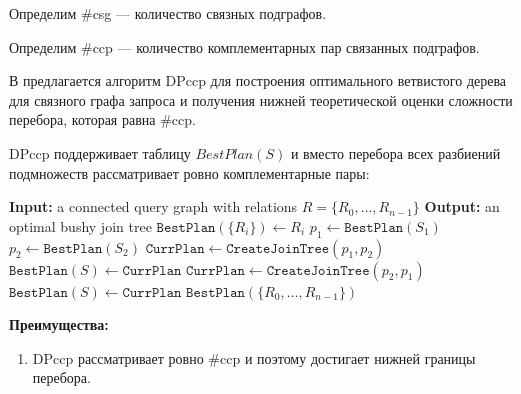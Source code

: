 Определим \#csg --- количество связных подграфов.
\par

Определим \#ccp --- количество комплементарных пар связанных подграфов.
\par

В \cite{CCP} предлагается алгоритм DPccp для построения оптимального ветвистого дерева для связного 
графа запроса и получения нижней теоретической оценки сложности перебора, которая равна \#ccp.

DPccp поддерживает таблицу $BestPlan(S)$ и вместо перебора всех разбиений подмножеств рассматривает ровно 
комплементарные пары:

\begin{algorithm}[H]
\caption{DPccp}
\begin{algorithmic}[1]
\State \textbf{Input:} a connected query graph with relations $R=\{R_0,\dots,R_{n-1}\}$
\State \textbf{Output:} an optimal bushy join tree
    \State $\texttt{BestPlan}(\{R_i\}) \gets R_i$
\EndFor
{}
    \State $p_1 \gets \texttt{BestPlan}(S_1)$
    \State $p_2 \gets \texttt{BestPlan}(S_2)$
    \State $\texttt{CurrPlan} \gets \texttt{CreateJoinTree}(p_1,p_2)$
        \State $\texttt{BestPlan}(S) \gets \texttt{CurrPlan}$
    \EndIf
    \State $\texttt{CurrPlan} \gets \texttt{CreateJoinTree}(p_2,p_1)$
        \State $\texttt{BestPlan}(S) \gets \texttt{CurrPlan}$
    \EndIf
\EndFor
\State \Return $\texttt{BestPlan}(\{R_0,\dots,R_{n-1}\})$
\end{algorithmic}
\end{algorithm}

\textbf{Преимущества:}
\begin{enumerate}
    \item DPccp рассматривает ровно \#ccp и поэтому достигает нижней границы перебора.
\end{enumerate}

